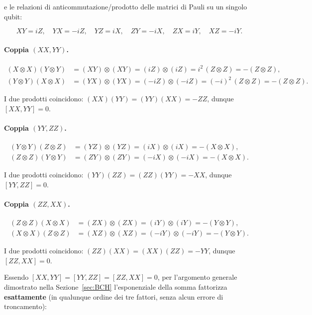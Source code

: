 \documentclass[11pt,a4paper]{article}
\begin{document}
e le relazioni di anticommutazione/prodotto delle matrici di Pauli su un singolo qubit:

\begin{equation}
XY = iZ,\quad YX=-iZ,\quad YZ=iX,\quad ZY=-iX,\quad ZX=iY,\quad XZ=-iY.
\end{equation}

\paragraph{Coppia $(XX,YY)$.}

\begin{align}
(X\otimes X)(Y\otimes Y) &= (XY)\otimes(XY) = (iZ)\otimes(iZ) = i^2\,(Z\otimes Z) = -(Z\otimes Z),\\
(Y\otimes Y)(X\otimes X) &= (YX)\otimes(YX) = (-iZ)\otimes(-iZ) = (-i)^2\,(Z\otimes Z) = -(Z\otimes Z).
\end{align}

I due prodotti coincidono: $(XX)(YY) = (YY)(XX) = -ZZ$, dunque $[XX,YY]=0$.

\paragraph{Coppia $(YY,ZZ)$.}

\begin{align}
(Y\otimes Y)(Z\otimes Z) &= (YZ)\otimes(YZ) = (iX)\otimes(iX) = -(X\otimes X),\\
(Z\otimes Z)(Y\otimes Y) &= (ZY)\otimes(ZY) = (-iX)\otimes(-iX) = -(X\otimes X).
\end{align}

I due prodotti coincidono: $(YY)(ZZ)=(ZZ)(YY)=-XX$, dunque $[YY,ZZ]=0$.

\paragraph{Coppia $(ZZ,XX)$.}

\begin{align}
(Z\otimes Z)(X\otimes X) &= (ZX)\otimes(ZX) = (iY)\otimes(iY) = -(Y\otimes Y),\\
(X\otimes X)(Z\otimes Z) &= (XZ)\otimes(XZ) = (-iY)\otimes(-iY) = -(Y\otimes Y).
\end{align}

I due prodotti coincidono: $(ZZ)(XX)=(XX)(ZZ)=-YY$, dunque $[ZZ,XX]=0$.

\medskip
\noindent Essendo $[XX,YY]=[YY,ZZ]=[ZZ,XX]=0$, per l'argomento generale dimostrato nella Sezione~\ref{sec:BCH} l'esponenziale della somma fattorizza \textbf{esattamente} (in qualunque ordine dei tre fattori, senza alcun errore di troncamento):
\end{document}
